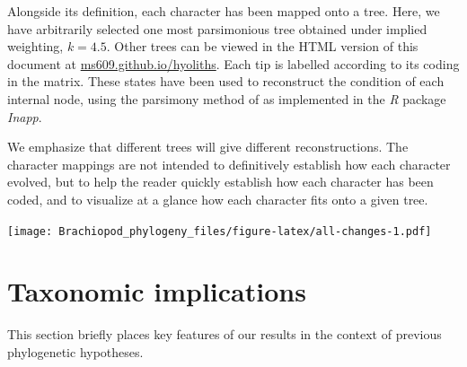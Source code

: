 \documentclass[openany]{book}
\begin{document}
Alongside its definition, each character has been mapped onto a tree.
Here, we have arbitrarily selected one most parsimonious tree obtained
under implied weighting, \(k = 4.5\). Other trees can be viewed in the
HTML version of this document at
\href{https://ms609.github.io/hyoliths/reconstructions.html}{ms609.github.io/hyoliths}.
Each tip is labelled according to its coding in the matrix. These states
have been used to reconstruct the condition of each internal node, using
the parsimony method of \citet{Brazeau2018} as implemented in the
\emph{R} package \emph{Inapp}.

We emphasize that different trees will give different reconstructions.
The character mappings are not intended to definitively establish how
each character evolved, but to help the reader quickly establish how
each character has been coded, and to visualize at a glance how each
character fits onto a given tree.







\texttt{[image: Brachiopod\_phylogeny\_files/figure-latex/all-changes-1.pdf]}

\chapter{Taxonomic implications}\label{taxonomic-implications}

This section briefly places key features of our results in the context
of previous phylogenetic hypotheses.
\end{document}
